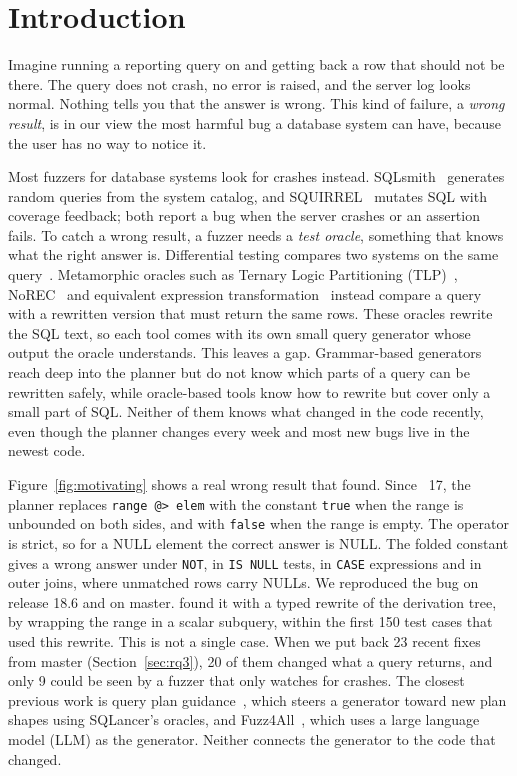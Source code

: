 \section{Introduction}
\label{sec:intro}

Imagine running a reporting query on \pg and getting back a row that should not
be there. The query does not crash, no error is raised, and the server log looks
normal. Nothing tells you that the answer is wrong. This kind of failure, a
\emph{wrong result}, is in our view the most harmful bug a database system can
have, because the user has no way to notice it.

Most fuzzers for database systems look for crashes instead.
SQLsmith~\cite{sqlsmith} generates random queries from the system catalog, and
SQUIRREL~\cite{zhong2020squirrel} mutates SQL with coverage feedback; both
report a bug when the server crashes or an assertion fails. To catch a wrong
result, a fuzzer needs a \emph{test oracle}, something that knows what the
right answer is. Differential testing compares two systems on the same
query~\cite{slutz1998rags}. Metamorphic oracles such as Ternary Logic
Partitioning (TLP)~\cite{rigger2020tlp}, NoREC~\cite{rigger2020norec} and
equivalent expression transformation~\cite{jiang2024eet} instead compare a query
with a rewritten version that must return the same rows. These oracles rewrite
the SQL text, so each tool comes with its own small query generator whose output
the oracle understands. This leaves a gap. Grammar-based generators reach deep
into the planner but do not know which parts of a query can be rewritten safely,
while oracle-based tools know how to rewrite but cover only a small part of SQL.
Neither of them knows what changed in the code recently, even though the \pg
planner changes every week and most new bugs live in the newest code.

Figure~\ref{fig:motivating} shows a real wrong result that \tool found. Since
\pg~17, the planner replaces \texttt{range @> elem} with the constant
\texttt{true} when the range is unbounded on both sides, and with \texttt{false}
when the range is empty. The operator is strict, so for a NULL element the
correct answer is NULL. The folded constant gives a wrong answer under
\texttt{NOT}, in \texttt{IS NULL} tests, in \texttt{CASE} expressions and in
outer joins, where unmatched rows carry NULLs. We reproduced the bug on release
18.6 and on master. \tool found it with a typed rewrite of the derivation tree,
by wrapping the range in a scalar subquery, within the first 150 test cases that
used this rewrite. This is not a single case. When we put back 23 recent fixes
from \pg master (Section~\ref{sec:rq3}), 20 of them changed what a query
returns, and only 9 could be seen by a fuzzer that only watches for crashes. The closest previous work is query plan guidance~\cite{ba2023qpg},
which steers a generator toward new plan shapes using SQLancer's oracles, and
Fuzz4All~\cite{xia2024fuzz4all}, which uses a large language model (LLM) as the
generator. Neither connects the generator to the code that changed.

